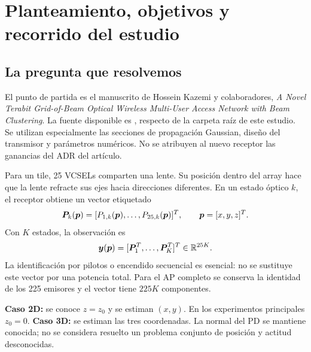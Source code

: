 \section{Planteamiento, objetivos y recorrido del estudio}
\subsection{La pregunta que resolvemos}
El punto de partida es el manuscrito de Hossein Kazemi y colaboradores, \emph{A Novel Terabit Grid-of-Beam Optical Wireless Multi-User Access Network with Beam Clustering}. La fuente disponible es , respecto de la carpeta raíz de este estudio. Se utilizan especialmente las secciones de propagación Gaussian, diseño del transmisor y parámetros numéricos. No se atribuyen al nuevo receptor las ganancias del ADR del artículo.

Para un tile, 25 VCSELs comparten una lente. Su posición dentro del array hace que la lente refracte sus ejes hacia direcciones diferentes. En un estado óptico $k$, el receptor obtiene un vector etiquetado
\begin{equation}
\bm{P}_k(\bm{p})=[P_{1,k}(\bm{p}),\ldots,P_{25,k}(\bm{p})]^T,
\qquad \bm{p}=[x,y,z]^T.
\end{equation}
Con $K$ estados, la observación es
\begin{equation}\label{eq:observation}
\bm{y}(\bm{p})=[\bm{P}_1^T,\ldots,\bm{P}_K^T]^T\in\mathbb R^{25K}.
\end{equation}
La identificación por pilotos o encendido secuencial es esencial: no se sustituye este vector por una potencia total. Para el AP completo se conserva la identidad de los 225 emisores y el vector tiene $225K$ componentes.

\textbf{Caso 2D:} se conoce $z=z_0$ y se estiman $(x,y)$. En los experimentos principales $z_0=0$. \textbf{Caso 3D:} se estiman las tres coordenadas. La normal del PD se mantiene conocida; no se considera resuelto un problema conjunto de posición y actitud desconocidas.

